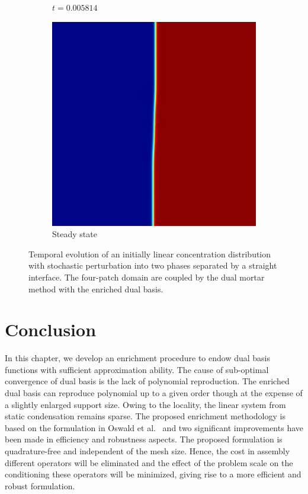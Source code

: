 \begin{figure}[ht]
\begin{subfigure}[t]{.3\linewidth}
		\vspace{-.4\baselineskip}
		\caption{{$t=0.005814$}}
	\end{subfigure}
	\begin{subfigure}[t]{.3\linewidth}
		\center
		\includegraphics[scale=.25]{linear_ch_8}
		\vspace{-.4\baselineskip}
		\caption{Steady state}
	\end{subfigure}
	\caption{Temporal evolution of an initially linear concentration distribution with stochastic perturbation into two phases separated by a straight interface. The four-patch domain are coupled by the dual mortar method with the enriched dual basis.}\label{fig:phase_field_linear}
\end{figure}
\FloatBarrier

\section{Conclusion}\label{sec:conlusion}

In this chapter, we develop an enrichment procedure to endow \Bezier dual basis functions with sufficient approximation ability. The cause of sub-optimal convergence of \Bezier dual basis is the lack of polynomial reproduction. The enriched \Bezier dual basis can reproduce polynomial up to a given order though at the expense of a slightly enlarged support size. Owing to the locality, the linear system from static condensation remains sparse. The proposed enrichment methodology is based on the formulation in Oswald et al.~\cite{oswald2001polynomial} and two significant improvements have been made in efficiency and robustness aspects. The proposed formulation is quadrature-free and independent of the mesh size. Hence, the cost in assembly different operators will be eliminated and the effect of the problem scale on the conditioning these operators will be minimized, giving rise to a more efficient and robust formulation. \par

